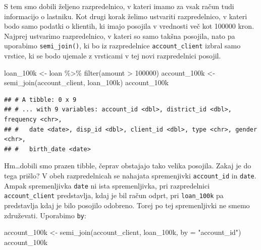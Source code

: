 \documentclass[
]{book}
\newenvironment{Shaded}{\begin{snugshade}}{\end{snugshade}}
\newcommand{\AttributeTok}[1]{\textcolor[rgb]{0.77,0.63,0.00}{#1}}
\newcommand{\DecValTok}[1]{\textcolor[rgb]{0.00,0.00,0.81}{#1}}
\newcommand{\FunctionTok}[1]{\textcolor[rgb]{0.00,0.00,0.00}{#1}}
\newcommand{\NormalTok}[1]{#1}
\newcommand{\OtherTok}[1]{\textcolor[rgb]{0.56,0.35,0.01}{#1}}
\newcommand{\SpecialCharTok}[1]{\textcolor[rgb]{0.00,0.00,0.00}{#1}}
\newcommand{\StringTok}[1]{\textcolor[rgb]{0.31,0.60,0.02}{#1}}
\begin{document}
S tem smo dobili željeno razpredelnico, v kateri imamo za vsak račun tudi informacijo o lastniku. Kot drugi korak želimo ustvariti razpredelnico, v kateri bodo samo podatki o klientih, ki imajo posojila v vrednosti več kot 100000 kron. Najprej ustvarimo razpredelnico, v kateri so samo takšna posojila, nato pa uporabimo \texttt{semi\_join()}, ki bo iz razpredelnice \texttt{account\_client} izbral samo vrstice, ki se bodo ujemale z vrsticami v tej novi razpredelnici posojil.

\begin{Shaded}
\begin{Highlighting}[]
\NormalTok{loan\_100k }\OtherTok{\textless{}{-}}\NormalTok{ loan }\SpecialCharTok{\%\textgreater{}\%}
  \FunctionTok{filter}\NormalTok{(amount }\SpecialCharTok{\textgreater{}} \DecValTok{100000}\NormalTok{)}
\NormalTok{account\_100k }\OtherTok{\textless{}{-}} \FunctionTok{semi\_join}\NormalTok{(account\_client, loan\_100k)}
\NormalTok{account\_100k}
\end{Highlighting}
\end{Shaded}

\begin{verbatim}
## # A tibble: 0 x 9
## # ... with 9 variables: account_id <dbl>, district_id <dbl>, frequency <chr>,
## #   date <date>, disp_id <dbl>, client_id <dbl>, type <chr>, gender <chr>,
## #   birth_date <date>
\end{verbatim}

Hm\ldots dobili smo prazen tibble, čeprav obstajajo tako velika posojila. Zakaj je do tega prišlo? V obeh razpredelnicah se nahajata spremenjivki \texttt{account\_id} in \texttt{date}. Ampak spremenljivka \texttt{date} ni ista spremenljivka, pri razpredelnici \texttt{account\_client} predstavlja, kdaj je bil račun odprt, pri \texttt{loan\_100k} pa predstavlja kdaj je bilo posojilo odobreno. Torej po tej spremenljivki ne smemo združevati. Uporabimo \texttt{by}:

\begin{Shaded}
\begin{Highlighting}[]
\NormalTok{account\_100k }\OtherTok{\textless{}{-}} \FunctionTok{semi\_join}\NormalTok{(account\_client, loan\_100k, }\AttributeTok{by =} \StringTok{"account\_id"}\NormalTok{)}
\NormalTok{account\_100k}
\end{Highlighting}
\end{Shaded}
\end{document}
